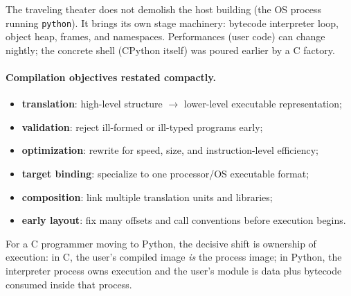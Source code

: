 The traveling theater does not demolish the host building (the OS process running \texttt{python}). It brings its own stage machinery: bytecode interpreter loop, object heap, frames, and namespaces. Performances (user code) can change nightly; the concrete shell (CPython itself) was poured earlier by a C factory.

\paragraph{Compilation objectives restated compactly.}
\begin{itemize}
    \item \textbf{translation}: high-level structure $\rightarrow$ lower-level executable representation;
    \item \textbf{validation}: reject ill-formed or ill-typed programs early;
    \item \textbf{optimization}: rewrite for speed, size, and instruction-level efficiency;
    \item \textbf{target binding}: specialize to one processor/OS executable format;
    \item \textbf{composition}: link multiple translation units and libraries;
    \item \textbf{early layout}: fix many offsets and call conventions before execution begins.
\end{itemize}

For a C programmer moving to Python, the decisive shift is ownership of execution: in C, the user's compiled image \emph{is} the process image; in Python, the interpreter process owns execution and the user's module is data plus bytecode consumed inside that process.
